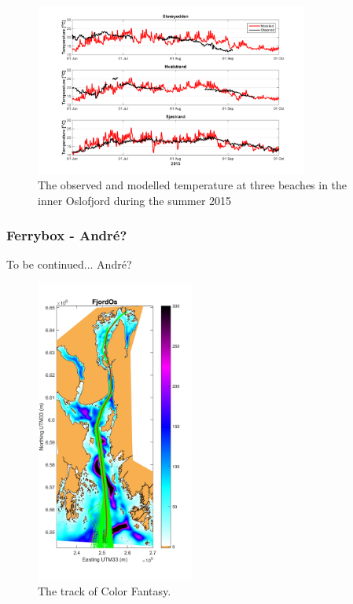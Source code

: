 \documentclass[12pt,a4paper,english]{article}
\begin{document}
\begin{figure}[ht]
\centerline{
\includegraphics*[trim=0 0 0 0,clip=true,width=0.8\textwidth]{Figurer/badetemp_2015}
}
\caption{\small
The observed and modelled temperature at three beaches in the inner Oslofjord during the summer 2015}
\label{fig:badetemp_2015}
\end{figure}


\subsubsection{Ferrybox - Andr\'{e}?}
To be continued... Andr\'{e}?

\begin{figure}[ht]
\centerline{
\includegraphics*[trim=1cm 0cm 1cm 0cm,clip=true,height=10cm]{Figurer/FjordOs_with_FA_track}}
\caption{\small
The track of Color Fantasy.}
\label{fig:Ferrybox_track}
\end{figure}
\end{document}
